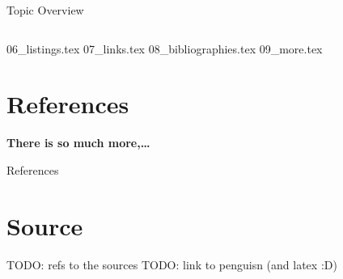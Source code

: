 



\begin{frame}{Topic Overview}
\begin{columns}[c,onlytextwidth]
\tableofcontents[sections={1-4}]
\tableofcontents[sections={5-8}]
\end{columns}
\end{frame}

{06_listings.tex}
{07_links.tex}
{08_bibliographies.tex}
{09_more.tex}

\appendix
\beginbackup

\section{References}

\begin{frame}[plain,c]{}
   \vspace*{4em}\centering\Large\bfseries There is so much more,\ldots
\end{frame}

\begin{frame}[allowframebreaks]{References}
\printbibliography
\end{frame}


\section{Source}
\begin{frame}
   TODO: refs to the sources
   TODO: link to penguisn (and latex :D)
\end{frame}
\backupend


